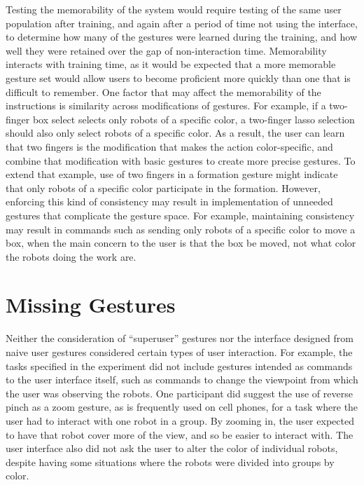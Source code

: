 Testing the memorability of the system would require testing of the same user population after training, and again after a period of time not using the interface, to determine how many of the gestures were learned during the training, and how well they were retained over the gap of non-interaction time. 
Memorability interacts with training time, as it would be expected that a more memorable gesture set would allow users to become proficient more quickly than one that is difficult to remember.
One factor that may affect the memorability of the instructions is similarity across modifications of gestures. 
For example, if a two-finger box select selects only robots of a specific color, a two-finger lasso selection should also only select robots of a specific color. 
As a result, the user can learn that two fingers is the modification that makes the action color-specific, and combine that modification with basic gestures to create more precise gestures. 
To extend that example, use of two fingers in a formation gesture might indicate that only robots of a specific color participate in the formation. 
However, enforcing this kind of consistency may result in implementation of unneeded gestures that complicate the gesture space. 
For example, maintaining consistency may result in commands such as sending only robots of a specific color to move a box, when the main concern to the user is that the box be moved, not what color the robots doing the work are.  

\section{Missing Gestures}

Neither the consideration of ``superuser'' gestures nor the interface designed from naive user gestures considered certain types of user interaction. For example, the tasks specified in the experiment did not include gestures intended as commands to the user interface itself, such as commands to change the viewpoint from which the user was observing the robots. 
One participant did suggest the use of reverse pinch as a zoom gesture, as is frequently used on cell phones, for a task where the user had to interact with one robot in a group. 
By zooming in, the user expected to have that robot cover more of the view, and so be easier to interact with. 
The user interface also did not ask the user to alter the color of individual robots, despite having some situations where the robots were divided into groups by color. 

